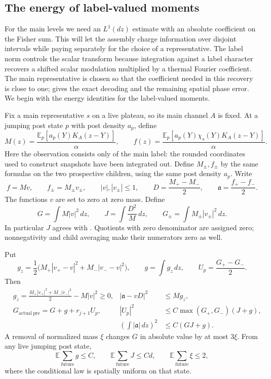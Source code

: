 \subsection{The energy of label-valued moments}

For the main levels we need an $L^1(dz)$ estimate with an absolute
coefficient on the Fisher sum. This will let the assembly charge information
over disjoint intervals while paying separately for the choice of a
representative. The label norm controls the scalar transform because
integration against a label character recovers a shifted scalar modulation
multiplied by a thermal Fourier coefficient. The main representative is
chosen so that the coefficient needed in this recovery is close to one;
 gives the exact decoding and the remaining spatial
phase error. We begin with the energy identities for the label-valued moments.

Fix a main representative $s$ on a live plateau, so its main channel $A$
is fixed. At a jumping post state $p$ with post density $a_p$, define
\[
 M(z)=\frac{\mathbb E_p[a_p(Y)K_A(z-Y)]}{\alpha},\qquad
 f(z)=\frac{\mathbb E_p[a_p(Y)\chi_s(Y)K_A(z-Y)]}{\alpha}.
\]
Here the observation consists only of the main label: the rounded
coordinates used to construct snapshots have been integrated out. Define
$M_\pm,f_\pm$ by the same formulas on the two prospective children, using
the same post density $a_p$. Write
\[
 f=Mv,\qquad f_\pm=M_\pm v_\pm,\qquad |v|,|v_\pm|\le1,
 \qquad D=\frac{M_+-M_-}2,\qquad \mathfrak a=\frac{f_+-f_-}2.
\]
The functions $v$ are set to zero at zero mass.  Define
\[
 G=\int M|v|^2\,dz,\qquad J=\int\frac{D^2}{M}\,dz,
 \qquad G_\pm=\int M_\pm|v_\pm|^2\,dz.
\]
In particular $J$ agrees with .  Quotients with zero
denominator are assigned zero; nonnegativity and child averaging make
their numerators zero as well.

\begin{lemma}
\label{lemma:paths-innovation}
Put
\[
 g_z=\frac12\big(M_+|v_+-v|^2+M_-|v_--v|^2\big),\qquad
 g=\int g_z\,dz,\qquad U_p=\frac{G_+-G_-}2.
\]
Then
\begin{align}
 &g_z=\frac{M_+|v_+|^2+M_-|v_-|^2}{2}-M|v|^2\ge0,
       &|\mathfrak a-vD|^2&\le M g_z,\label{eq:paths-innovation-pointwise}\\
 &G_{\mathrm{actual\ pre}}=G+g+r_{j+1}U_p,
       &|U_p|^2&\le C\max(G_+,G_-)(J+g),\label{eq:paths-energy-noise}\\
 &&\left(\int|\mathfrak a|\,dz\right)^2&\le C(GJ+g).
       \label{eq:paths-moment-variation}
\end{align}
A removal of normalized mass $\xi$ changes $G$ in absolute value by at
most $3\xi$.  From any live jumping post state,
\begin{equation}
 \mathbb E\sum_{\mathrm{future}}g\le C,
 \qquad \mathbb E\sum_{\mathrm{future}}J\le Cd,
 \qquad \mathbb E\sum_{\mathrm{future}}\xi\le2,
 \label{eq:paths-forward-budgets}
\end{equation}
where the conditional law is spatially uniform on that state.
\end{lemma}

